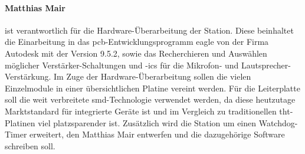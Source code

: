 \paragraph{Matthias Mair} ist verantwortlich für die Hardware-Überarbeitung der Station.
Diese beinhaltet die Einarbeitung in das \ac{pcb}-Entwicklungsprogramm \ac{eagle} von der Firma Autodesk mit der Version 9.5.2, sowie das Recherchieren und Auswählen möglicher Verstärker-Schaltungen und -\ac{ic}s für die Mikrofon- und Lautsprecher-Verstärkung.
Im Zuge der Hardware-Überarbeitung sollen die vielen Einzelmodule in einer übersichtlichen Platine vereint werden.
Für die Leiterplatte soll die weit verbreitete \ac{smd}-Technologie verwendet werden, da diese heutzutage Marktstandard für integrierte Geräte ist und im Vergleich zu traditionellen \ac{tht}-Platinen viel platzsparender ist.
Zusätzlich wird die Station um einen Watchdog-Timer erweitert, den Matthias Mair entwerfen und die dazugehörige Software schreiben soll.